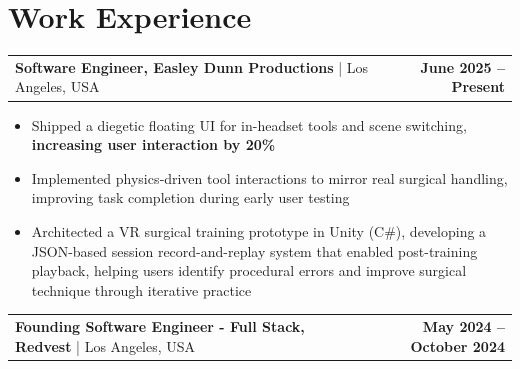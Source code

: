 \documentclass[10pt, letterpaper]{article}
\newenvironment{highlights}{
    \begin{itemize}[
        topsep=0.06 cm,
        parsep=0.06 cm,
        partopsep=0pt,
        itemsep=0pt,
        leftmargin=0 cm + 10pt
    ]
}{
    \end{itemize}
}
\newenvironment{onecolentry}{
    \par\noindent
}{
    \par
}
\begin{document}
\section{Work Experience}

\begin{tabularx}{\textwidth}{@{}Xr@{}}
    \textbf{Software Engineer, Easley Dunn Productions} | Los Angeles, USA & \textbf{June 2025 – Present} \\
\end{tabularx}
\vspace{-4.5mm}
\begin{onecolentry}
    \begin{highlights}
    
    \item[--] Shipped a diegetic floating UI for in-headset tools and scene switching, \textbf{increasing user interaction by 20\%}
    \item[--] Implemented physics‐driven tool interactions to mirror real surgical handling, improving task completion during early user testing
    \item[--] Architected a VR surgical training prototype in Unity (C\#), developing a JSON-based session record-and-replay system that enabled post-training playback, helping users identify procedural errors and improve surgical technique through iterative practice
    \end{highlights}
\end{onecolentry}
\vspace{0.0 cm}
\begin{tabularx}{\textwidth}{@{}Xr@{}}
    \textbf{Founding Software Engineer - Full Stack, Redvest} | Los Angeles, USA & \textbf{May 2024 – October 2024} \\
\end{tabularx}
\vspace{-4.5mm}
\end{document}
